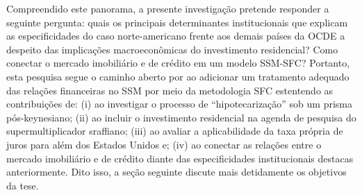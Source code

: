 Compreendido este panorama, a presente investigação pretende responder a seguinte pergunta: quais os principais determinantes institucionais que explicam as especificidades do caso norte-americano frente aos demais países da OCDE a despeito das implicações macroeconômicas do investimento residencial? Como conectar o mercado imobiliário e de crédito em um modelo SSM-SFC? 
Portanto, esta pesquisa segue o caminho aberto por \textcite{brochier_supermultiplier_2018} ao adicionar um tratamento adequado das relações financeiras no SSM por meio da metodologia SFC estentendo as contribuições de: 
(i) \textcite{jorda_great_2014} ao investigar o processo de ``hipotecarização'' sob um prisma pós-keynesiano; 
(ii) \textcite{serrano_sraffian_1995} ao incluir o investimento residencial na agenda de pesquisa do supermultiplicador sraffiano; 
(iii) \textcite{teixeira_crescimento_2015} ao avaliar a aplicabilidade da taxa própria de juros para além dos Estados Unidos e;
(iv) \textcite{da_silveira_investimento_2019} ao conectar as relações entre o mercado imobiliário e de crédito diante das especificidades institucionais destacas anteriormente. Dito isso, a seção seguinte discute mais detidamente os objetivos da tese.


